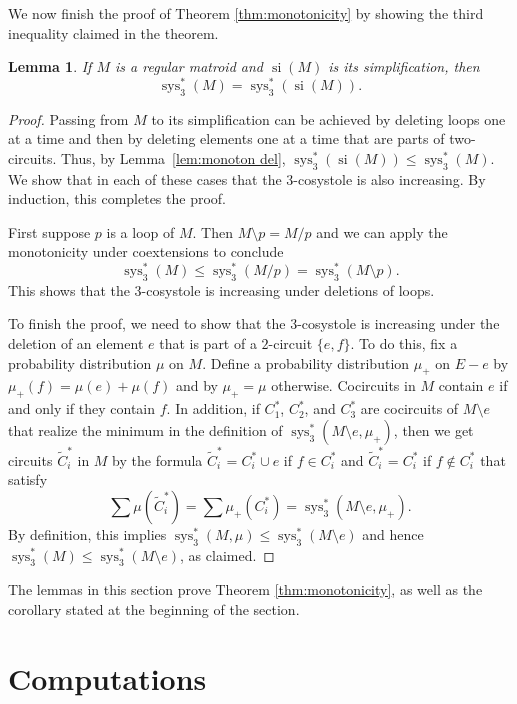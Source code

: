 \documentclass[reqno,12pt]{amsart}
\newtheorem{lemma}[theorem]{Lemma}
\numberwithin{theorem}{section}
\theoremstyle{plain}
\theoremstyle{definition}
\theoremstyle{remark}
\numberwithin{equation}{section}
\numberwithin{table}{section}
\DeclareMathOperator{\sys}{sys}
\begin{document}
We now finish the proof of Theorem \ref{thm:monotonicity} by showing the third inequality claimed in the theorem.

\begin{lemma}
If $M$ is a regular matroid and $\operatorname{si}(M)$ is its simplification, then
    \[\sys_3^*(M) = \sys_3^*(\operatorname{si}(M)).\]
\end{lemma}

\begin{proof}
Passing from $M$ to its simplification can be achieved by deleting loops one at a time and then by deleting elements one at a time that are parts of two-circuits. Thus, by Lemma~\ref{lem:monoton del}, $\sys_3^*(\operatorname{si}(M))\leq \sys_3^*(M)$. We show that in each of these cases that the $3$-cosystole is also increasing. By induction, this completes the proof.

First suppose $p$ is a loop of $M$. Then $M\setminus p = M/p$ and we can apply the monotonicity under coextensions to conclude
    \[\sys_3^*(M) \leq \sys_3^*(M/p) = \sys_3^*(M\setminus p).\]
This shows that the $3$-cosystole is increasing under deletions of loops.

To finish the proof, we need to show that the $3$-cosystole is increasing under the deletion of an element $e$ that is part of a $2$-circuit $\{e,f\}$. To do this, fix a probability distribution $\mu$ on $M$. Define a probability distribution $\mu_+$ on $E - e$ by $\mu_+(f) = \mu(e) + \mu(f)$ and by $\mu_+ = \mu$ otherwise. Cocircuits in $M$ contain $e$ if and only if they contain $f$. In addition, if $C_1^*$, $C_2^*$, and $C_3^*$ are cocircuits of $M\setminus e$ that realize the minimum in the definition of $\sys_3^*(M\setminus e, \mu_+)$, then we get circuits $\tilde C_i^*$ in $M$ by the formula $\tilde C_i^* = C_i^* \cup e$ if $f \in C_i^*$ and $\tilde C_i^* = C_i^*$ if $f \not\in C_i^*$ that satisfy
    \[\sum \mu(\tilde C_i^*) = \sum \mu_+(C_i^*) = \sys_3^*(M\setminus e,\mu_+).\]
By definition, this implies $\sys_3^*(M,\mu) \leq \sys_3^*(M\setminus e)$ and hence $\sys_3^*(M) \leq \sys_3^*(M\setminus e)$, as claimed.
\end{proof}

The lemmas in this section prove Theorem \ref{thm:monotonicity}, as well as the corollary stated at the beginning of the section.


\vspace{1em}
\section{Computations}
\label{sec:estimates}
\vspace{1em}
\end{document}
